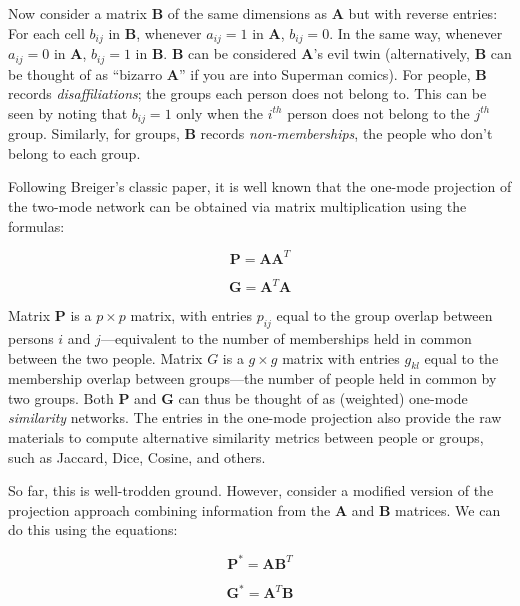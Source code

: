 \documentclass[a4paper,fleqn]{cas-sc}
\begin{document}
Now consider a matrix $\mathbf{B}$ of the same dimensions as $\mathbf{A}$ but with reverse entries: For each cell $b_{ij}$ in $\mathbf{B}$, whenever $a_{ij} = 1$ in $\mathbf{A}$, $b_{ij} = 0$. In the same way, whenever $a_{ij} = 0$ in $\mathbf{A}$, $b_{ij} = 1$ in $\mathbf{B}$. $\mathbf{B}$ can be considered $\mathbf{A}$'s evil twin (alternatively, $\mathbf{B}$ can be thought of as ``bizarro $\mathbf{A}$'' if you are into Superman comics). For people, $\mathbf{B}$ records \textit{disaffiliations}; the groups each person does not belong to. This can be seen by noting that $b_{ij} = 1$ only when the $i^{th}$ person does not belong to the $j^{th}$ group. Similarly, for groups, $\mathbf{B}$ records \textit{non-memberships}, the people who don't belong to each group. 

Following Breiger's \citeyearpar{breiger1974duality} classic paper, it is well known that the one-mode projection of the two-mode network can be obtained via matrix multiplication using the formulas:

\begin{equation}
    \textbf{P} = \textbf{AA}^T
\end{equation}

\begin{equation}
    \textbf{G} = \textbf{A}^T\textbf{A}
\end{equation}

Matrix $\mathbf{P}$ is a $p \times p$ matrix, with entries $p_{ij}$ equal to the group overlap between persons $i$ and $j$---equivalent to the number of memberships held in common between the two people. Matrix $G$ is a $g \times g$ matrix with entries $g_{kl}$ equal to the membership overlap between groups---the number of people held in common by two groups. Both $\mathbf{P}$ and $\mathbf{G}$ can thus be thought of as (weighted) one-mode \textit{similarity} networks. The entries in the one-mode projection also provide the raw materials to compute alternative similarity metrics between people or groups, such as Jaccard, Dice, Cosine, and others. 

So far, this is well-trodden ground. However, consider a modified version of the projection approach combining information from the $\mathbf{A}$ and $\mathbf{B}$ matrices. We can do this using the equations:

\begin{equation}
    \textbf{P}^* = \textbf{AB}^T
\end{equation}

\begin{equation}
    \textbf{G}^* = \textbf{A}^T\textbf{B}
\end{equation}
\end{document}
